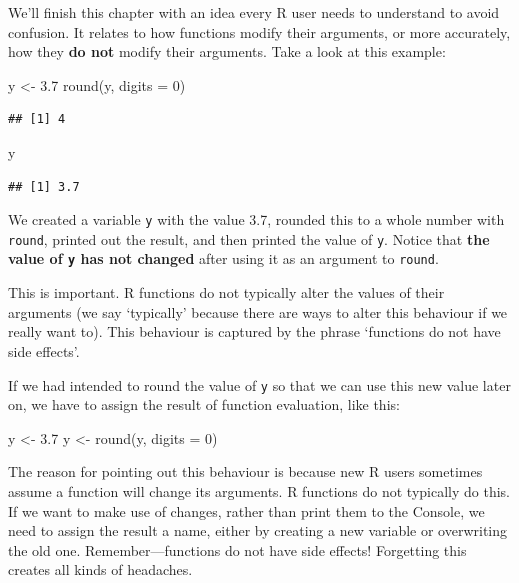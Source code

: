 \documentclass[
]{book}
\newenvironment{Shaded}{\begin{snugshade}}{\end{snugshade}}
\newcommand{\AttributeTok}[1]{\textcolor[rgb]{0.77,0.63,0.00}{#1}}
\newcommand{\DecValTok}[1]{\textcolor[rgb]{0.00,0.00,0.81}{#1}}
\newcommand{\FloatTok}[1]{\textcolor[rgb]{0.00,0.00,0.81}{#1}}
\newcommand{\FunctionTok}[1]{\textcolor[rgb]{0.00,0.00,0.00}{#1}}
\newcommand{\NormalTok}[1]{#1}
\newcommand{\OtherTok}[1]{\textcolor[rgb]{0.56,0.35,0.01}{#1}}
\begin{document}
We'll finish this chapter with an idea every R user needs to understand to avoid confusion. It relates to how functions modify their arguments, or more accurately, how they \textbf{do not} modify their arguments. Take a look at this example:

\begin{Shaded}
\begin{Highlighting}[]
\NormalTok{y }\OtherTok{\textless{}{-}} \FloatTok{3.7}
\FunctionTok{round}\NormalTok{(y, }\AttributeTok{digits =} \DecValTok{0}\NormalTok{)}
\end{Highlighting}
\end{Shaded}

\begin{verbatim}
## [1] 4
\end{verbatim}

\begin{Shaded}
\begin{Highlighting}[]
\NormalTok{y}
\end{Highlighting}
\end{Shaded}

\begin{verbatim}
## [1] 3.7
\end{verbatim}

We created a variable \texttt{y} with the value 3.7, rounded this to a whole number with \texttt{round}, printed out the result, and then printed the value of \texttt{y}. Notice that \textbf{the value of \texttt{y} has not changed} after using it as an argument to \texttt{round}.

This is important. R functions do not typically alter the values of their arguments (we say `typically' because there are ways to alter this behaviour if we really want to). This behaviour is captured by the phrase `functions do not have side effects'.

If we had intended to round the value of \texttt{y} so that we can use this new value later on, we have to assign the result of function evaluation, like this:

\begin{Shaded}
\begin{Highlighting}[]
\NormalTok{y }\OtherTok{\textless{}{-}} \FloatTok{3.7}
\NormalTok{y }\OtherTok{\textless{}{-}} \FunctionTok{round}\NormalTok{(y, }\AttributeTok{digits =} \DecValTok{0}\NormalTok{)}
\end{Highlighting}
\end{Shaded}

The reason for pointing out this behaviour is because new R users sometimes assume a function will change its arguments. R functions do not typically do this. If we want to make use of changes, rather than print them to the Console, we need to assign the result a name, either by creating a new variable or overwriting the old one. Remember---functions do not have side effects! Forgetting this creates all kinds of headaches.
\end{document}
